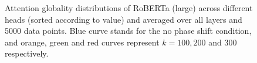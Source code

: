 \documentclass[letterpaper, 12pt]{report}
\begin{document}
\begin{figure}
    \centering
    \caption{Attention globality distributions of RoBERTa (large) across different heads (sorted according to value) and averaged over all layers and 5000 data points. Blue curve stands for the no phase shift condition, and orange, green and red curves represent $k=100,200$ and $300$ respectively.}
    \label{fig:globality_roberta-large}
\end{figure}
\end{document}
